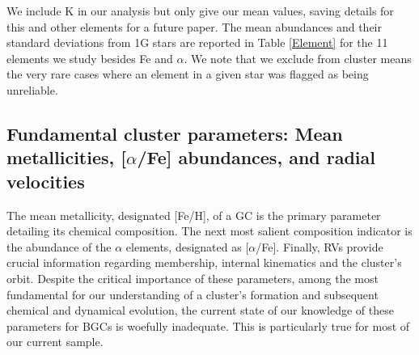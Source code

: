 \documentclass[onecolumn]{aa}
\begin{document}
We include K in our analysis but only give our mean values, saving details for this and other elements for a future paper. 
The mean abundances and their standard deviations from 1G stars are reported in Table \ref{Element} for the 11 elements we study besides Fe and $\alpha$. We note that we exclude from cluster means the very rare cases where an element in a given star was flagged as being unreliable. 

\subsection{Fundamental cluster parameters: Mean metallicities, [$\alpha$/Fe] abundances, and radial velocities}
The mean metallicity, designated [Fe/H], of a GC is the primary parameter detailing its chemical composition. The next most salient composition indicator is the abundance of the  $\alpha$ elements, designated as [$\alpha$/Fe].
Finally, RVs provide crucial information regarding membership, internal kinematics and the cluster's orbit. Despite the critical
importance of these parameters, among the most fundamental for our understanding of a cluster's formation and subsequent chemical and dynamical evolution, the current state of our knowledge of these parameters for BGCs is woefully inadequate. This is particularly true for most of our current sample. 
\end{document}

